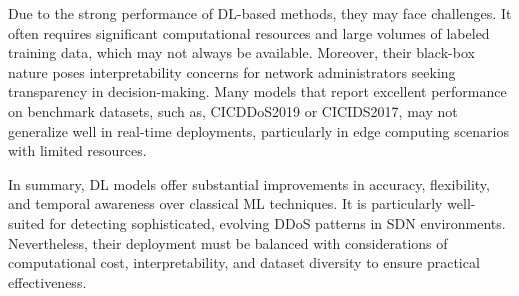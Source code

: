 \documentclass[ASNA,twocolumn]{USG} %
\begin{document}
Due to the strong performance of DL-based methods, they may face challenges. It often requires significant computational resources and large volumes of labeled training data, which may not always be available. Moreover, their black-box nature poses interpretability concerns for network administrators seeking transparency in decision-making. Many models \cite{shaheed2024hybrid, xu2025deep, min2023ddos} that report excellent performance on benchmark datasets, such as, CICDDoS2019 or CICIDS2017, may not generalize well in real-time deployments, particularly in edge computing scenarios with limited resources.

In summary, DL models offer substantial improvements in accuracy, flexibility, and temporal awareness over classical ML techniques. It is particularly well-suited for detecting sophisticated, evolving DDoS patterns in SDN environments. Nevertheless, their deployment must be balanced with considerations of computational cost, interpretability, and dataset diversity to ensure practical effectiveness. 

\end{document}
